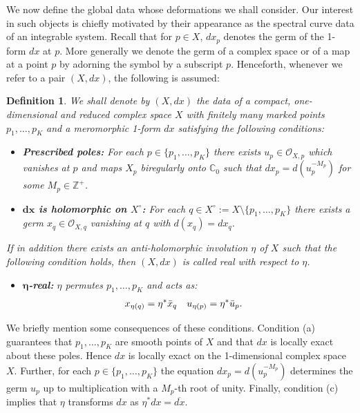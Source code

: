\documentclass[11pt,twoside]{amsart}
\theoremstyle{plain}
\newtheorem{definition}[theorem]{Definition}
\newcommand{\Sh}[1]{\mathcal{#1}} %
\newcommand{\dfx}{dx}
\begin{document}
We now define the global data whose deformations we shall consider. Our interest in such objects is chiefly motivated by their appearance as the spectral curve data of an integrable system.
Recall that for $p\in X$,  %
$\dfx_p$ denotes the germ of the 1-form $\dfx$ at $p$. More generally we denote the germ of a complex space or of a map at a point $p$ by adorning the symbol by a subscript $p$. 
%
Henceforth, whenever we refer to a pair $(X,\dfx)$, the following is assumed:
\begin{definition}\label{definition:single}
We shall denote by $(X,\dfx)$ the data of a compact, one-dimensional and reduced complex space $X$ with finitely many marked points $p_1,\ldots,p_K$ and a meromorphic 1-form $\dfx$ satisfying the following conditions: %
\begin{itemize}
\item[{\bf(a)}]{\bf Prescribed poles:} For each $p\in\{p_1,\ldots,p_K\}$ there exists $u_p\in\Sh{O}_{X,p}$ which vanishes at $p$ and maps $X_p$ biregularly onto $\mathbb{C}_0$ such that $\dfx_p=d(u_p^{-M_p})$ for some $M_p\in \mathbb{Z}^+$.
\item[{\bf(b)}]{\bf $\mathbf { \dfx} $ is holomorphic on $X^\circ$:} For each $q\in X^\circ:=X\setminus\{p_1,\ldots,p_K\}$ there exists a germ $x_q\in\Sh{O}_{X,q}$ vanishing at $q$ with $d(x_q)=\dfx_q$. %
\end {itemize}
If in addition there exists an anti-holomorphic involution $\eta$ of $X$ such that the following condition holds, then $(X,\dfx)$ is called \emph{real with respect to $\eta$}.
\begin {itemize}
\item[{\bf(c)}]{\bf $\boldsymbol{\eta}$-real:} $\eta$ permutes $p_1,\ldots,p_K$ and acts as:
\begin{align}\label{eq:real}
x_{\eta(q)}&=\eta^\ast\Bar{x}_q&%
u_{\eta(p)}&=\eta^\ast\Bar{u}_p.%
\end{align}
\end{itemize}
\end {definition}
%
We briefly mention some consequences of these conditions. Condition (a) guarantees that $p_1,\ldots,p_K$ are smooth points of $X$ and that $\dfx$ is locally exact about these poles. Hence $\dfx$ is locally exact on the 1-dimensional complex space $X$. Further, for each $p\in\{p_1,\ldots,p_K\}$ the equation $\dfx_p=d(u_p^{-M_p})$ determines the germ $u_p$ up to multiplication with a $M_p$-th root of unity. Finally, condition (c) implies that $\eta$ transforms $\dfx$ as $\eta^\ast \dfx=\overline{\dfx}$.
\end{document}
